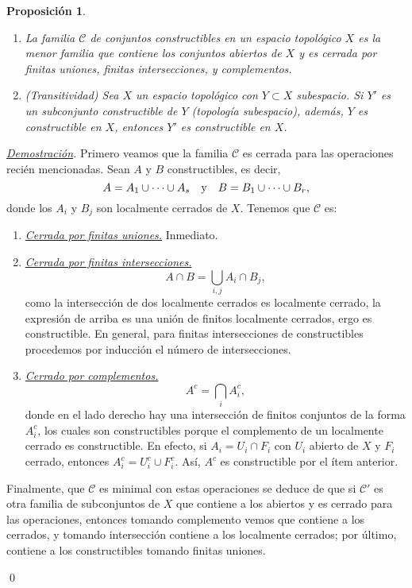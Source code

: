 \documentclass[12pt]{article}
\theoremstyle{customTheorem}
\newtheorem{proposition}[theorem]{Proposición}
\theoremstyle{customDefinition}
\renewenvironment{proof}[1][Demostración]{\noindent \textit{\underline{#1}.\hspace{2mm}}}{\hfill\qed}
\begin{document}
\begin{proposition}\label{Proposicion}
\begin{enumerate}
    \item La familia $\mathcal C$ de conjuntos constructibles en un espacio topológico $X$ es la menor familia que contiene los conjuntos abiertos de $X$ y es cerrada por finitas uniones, finitas intersecciones, y complementos.

    \item \textit{(Transitividad)} Sea $X$ un espacio topológico con $Y \subset X$ subespacio. Si $Y'$ es un subconjunto constructible de $Y$ (topología subespacio), además, $Y$ es constructible en $X$, entonces $Y'$ es constructible en $X$.
\end{enumerate}
\end{proposition}
\begin{proof}
    Primero veamos que la familia $\mathcal C$ es cerrada para las operaciones recién mencionadas. Sean $A$ y $B$ constructibles, es decir,
    \[
    A = A_1 \cup \cdots \cup A_s \quad \text y \quad B = B_1 \cup \cdots \cup B_r,
    \]
    donde los $A_i$ y $B_j$ son localmente cerrados de $X$. Tenemos que $\mathcal C$ es:
    \begin{enumerate}
        \item \underline{\textit{Cerrada por finitas uniones.}} Inmediato.
        \item \underline{\textit{Cerrada por finitas intersecciones.}}
        \[
        A \cap B = \bigcup_{i,j} A_i \cap B_j,
        \]
        como la intersección de dos localmente cerrados es localmente cerrado, la expresión de arriba es una unión de finitos localmente cerrados, ergo es constructible. En general, para finitas intersecciones de constructibles procedemos por inducción el número de intersecciones.
        \item \underline{\textit{Cerrado por complementos.}}
        \[
        A^c = \bigcap_i A_i^c,
        \]
        donde en el lado derecho hay una intersección de finitos conjuntos de la forma $A_i^c$, los cuales son constructibles porque el complemento de un localmente cerrado es constructible. En efecto, si $A_i = U_i \cap F_i$ con $U_i$ abierto de $X$ y $F_i$ cerrado, entonces $A_i^c = U_i^c \cup F_i^c$. Así, $A^c$ es constructible por el ítem anterior.
    \end{enumerate}

    Finalmente, que $\mathcal C$ es minimal con estas operaciones se deduce de que si $\mathcal C'$ es otra familia de subconjuntos de $X$ que contiene a los abiertos y es cerrado para las operaciones, entonces tomando complemento vemos que contiene a los cerrados, y tomando intersección contiene a los localmente cerrados; por último, contiene a los constructibles tomando finitas uniones.


\end{proof}
\end{document}
